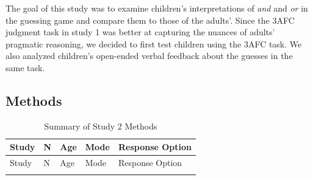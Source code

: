 \documentclass[floatsintext,man]{apa6}
\theoremstyle{definition}
\theoremstyle{definition}
\theoremstyle{definition}
\theoremstyle{remark}
\begin{document}
The goal of this study was to examine children's interpretations of
\emph{and} and \emph{or} in the guessing game and compare them to those
of the adults'. Since the 3AFC judgment task in study 1 was better at
capturing the nuances of adults' pragmatic reasoning, we decided to
first test children using the 3AFC task. We also analyzed children's
open-ended verbal feedback about the guesses in the same task.

\subsection{Methods}\label{methods-1}

\begin{longtable}[]{@{}lllll@{}}
\caption{\label{tab:study2info} Summary of Study 2 Methods}\tabularnewline
\toprule
\begin{minipage}[b]{0.11\columnwidth}\raggedright\strut
Study\strut
\end{minipage} & \begin{minipage}[b]{0.04\columnwidth}\raggedright\strut
N\strut
\end{minipage} & \begin{minipage}[b]{0.21\columnwidth}\raggedright\strut
Age\strut
\end{minipage} & \begin{minipage}[b]{0.17\columnwidth}\raggedright\strut
Mode\strut
\end{minipage} & \begin{minipage}[b]{0.32\columnwidth}\raggedright\strut
Response Option\strut
\end{minipage}\tabularnewline
\midrule
\endfirsthead
\toprule
\begin{minipage}[b]{0.11\columnwidth}\raggedright\strut
Study\strut
\end{minipage} & \begin{minipage}[b]{0.04\columnwidth}\raggedright\strut
N\strut
\end{minipage} & \begin{minipage}[b]{0.21\columnwidth}\raggedright\strut
Age\strut
\end{minipage} & \begin{minipage}[b]{0.17\columnwidth}\raggedright\strut
Mode\strut
\end{minipage} & \begin{minipage}[b]{0.32\columnwidth}\raggedright\strut
Response Option\strut
\end{minipage}\tabularnewline
\midrule
\endhead
\begin{minipage}[t]{0.11\columnwidth}\raggedright\strut

\end{minipage}
\end{longtable}
\end{document}
